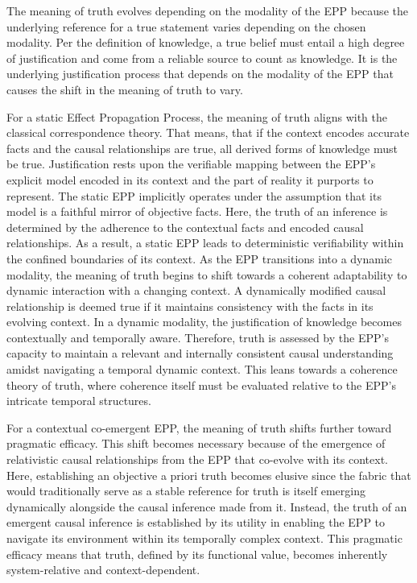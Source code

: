 \documentclass{article}
\begin{document}
The meaning of truth evolves depending on the modality of the EPP because the underlying reference for a true statement varies depending on the chosen modality. Per the definition of knowledge, a true belief must entail a high degree of justification and come from a reliable source to count as knowledge. It is the underlying justification process that depends on the modality of the EPP that causes the shift in the meaning of truth to vary.

For a static Effect Propagation Process, the meaning of truth aligns with the classical correspondence theory. That means, that if the context encodes accurate facts and the causal relationships are true, all derived forms of knowledge must be true.
Justification rests upon the verifiable mapping between the EPP's explicit model encoded in its context and the part of reality it purports to represent. The static EPP implicitly operates under the assumption that its model is a faithful mirror of objective facts. Here, the truth of an inference is determined by the adherence to the contextual facts and encoded causal relationships. As a result, a static EPP leads to deterministic verifiability within the confined boundaries of its context.
As the EPP transitions into a dynamic modality, the meaning of truth begins to shift towards a coherent adaptability to dynamic interaction with a changing context. A dynamically modified causal relationship is deemed true if it maintains consistency with the facts in its evolving context. In a dynamic modality,  the justification of knowledge becomes contextually and temporally aware. Therefore, truth is assessed by the EPP's capacity to maintain a relevant and internally consistent causal understanding amidst navigating a temporal dynamic context.  This leans towards a coherence theory of truth, where coherence itself must be evaluated relative to the EPP’s intricate temporal structures.

\newpage

For a contextual co-emergent EPP, the meaning of truth shifts further toward pragmatic efficacy. This shift becomes necessary because of the emergence of relativistic causal relationships from the EPP that co-evolve with its context. Here, establishing an objective a priori truth becomes elusive since the fabric that would traditionally serve as a stable reference for truth is itself emerging dynamically alongside the causal inference made from it. Instead, the truth of an emergent causal inference is established by its utility in enabling the EPP to navigate its environment within its temporally complex context.
This pragmatic efficacy means that truth, defined by its functional value, becomes inherently system-relative and context-dependent.
\end{document}
